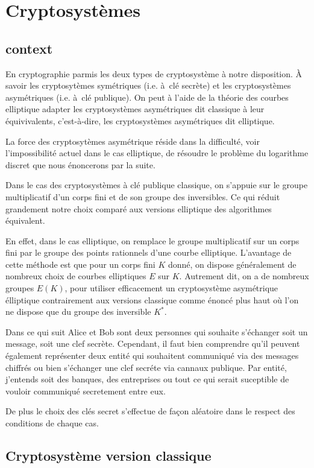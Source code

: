 \chapter{Cryptosystèmes}
\section{context}
En cryptographie parmis les deux types de cryptosystème à notre disposition. À savoir les cryptosytèmes symétriques (i.e. à clé secrète) et les cryptosystèmes asymétriques (i.e. à clé publique). On peut à l'aide de la théorie des courbes elliptique adapter les cryptosystèmes asymétriques dit classique à leur équivivalents, c'est-à-dire, les cryptosystèmes asymétriques dit elliptique.

La force des cryptosytèmes asymétrique réside dans la difficulté, voir l'impossibilité actuel dans le cas elliptique, de résoudre le problème du logarithme discret que nous énoncerons par la suite.

Dans le cas des cryptosystèmes à clé publique classique, on s'appuie sur le groupe multiplicatif d'un corps fini et de son groupe des inversibles. Ce qui réduit grandement notre choix comparé aux versions elliptique des algorithmes équivalent.

En effet, dans le cas elliptique, on remplace le groupe multiplicatif sur un corps fini par le groupe des points rationnels d'une courbe elliptique. L'avantage de cette méthode est que pour un corps fini  $K$ donné, on dispose généralement de nombreux choix de courbes elliptiques $E$ sur $K$. Autrement dit, on a de nombreux groupes $E(K)$, pour utiliser efficacement un cryptosystème asymétrique élliptique contrairement aux versions classique comme énoncé plus haut où
l'on ne dispose que du groupe des inversible $K^{*}$.


Dans ce qui suit Alice et Bob sont deux personnes qui souhaite s'échanger soit un message, soit une clef secrète. Cependant, il faut bien comprendre qu'il peuvent également représenter deux entité qui souhaitent communiqué via des messages chiffrés ou bien s'échanger une clef secréte via cannaux publique. Par entité, j'entends soit des banques, des entreprises ou tout ce qui serait suceptible de vouloir communiqué secretement entre eux.

De plus le choix des clés secret s'effectue de façon aléatoire dans le respect des conditions de chaque cas.
\section{Cryptosystème version classique}

